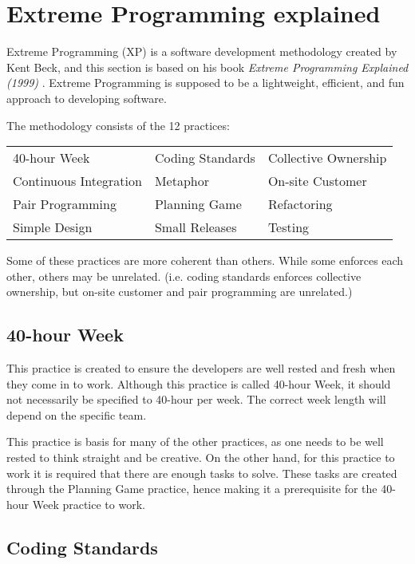 \section{Extreme Programming explained}
Extreme Programming (XP) is a software development methodology created by Kent Beck, and this section is based on his book \textit{Extreme Programming Explained (1999)} \citep{xp:explained}. 
Extreme Programming is supposed to be a lightweight, efficient, and fun approach to developing software.

\noindent The methodology consists of the 12 practices:

\begin{tabularx}{\textwidth}{X X X}
	40-hour Week				 & Coding Standards & Collective Ownership \\
	Continuous Integration	  & Metaphor         	 & On-site Customer     \\
	Pair Programming			& Planning Game		& Refactoring          \\
	Simple Design          		  & Small Releases   	& Testing             
\end{tabularx}

Some of these practices are more coherent than others. 
While some enforces each other, others may be unrelated. (i.e. coding standards enforces collective ownership, but on-site customer and pair programming are unrelated.)

\subsection{40-hour Week}
This practice is created to ensure the developers are well rested and fresh when they come in to work.
Although this practice is called 40-hour Week, it should not necessarily be specified to 40-hour per week.
The correct week length will depend on the specific team.

This practice is basis for many of the other practices, as one needs to be well rested to think straight and be creative.
On the other hand, for this practice to work it is required that there are enough tasks to solve.
These tasks are created through the Planning Game practice, hence making it a prerequisite for the 40-hour Week practice to work. 

\subsection{Coding Standards}

